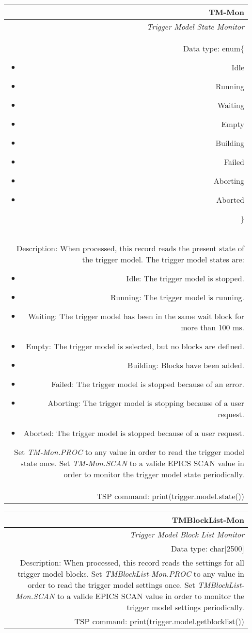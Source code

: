 \documentclass[openany]{article}
\begin{document}
		\begin{tabular}{N}
			\hline
			\bfseries TM-Mon\label{pv:tm-mon} \\ \hline
			\emph{Trigger Model State Monitor} \\
			Data type: enum\{\begin{itemize}[noitemsep]
				\small
				\item[] Idle
				\item[] Running
				\item[] Waiting
				\item[] Empty
				\item[] Building
				\item[] Failed
				\item[] Aborting
				\item[] Aborted
			\end{itemize}\} \\
			Description: When processed, this record reads the present state of the trigger model. The trigger model states are: \begin{itemize} \item Idle: The trigger model is stopped. \item Running: The trigger model is running. \item Waiting: The trigger model has been in the same wait block for more than 100 ms. \item Empty: The trigger model is selected, but no blocks are defined. \item Building: Blocks have been added. \item Failed: The trigger model is stopped because of an error. \item Aborting: The trigger model is stopping because of a user request. \item Aborted: The trigger model is stopped because of a user request. \end{itemize} Set \emph{TM-Mon.PROC} to any value in order to read the trigger model state once. Set \emph{TM-Mon.SCAN} to a valide EPICS SCAN value in order to monitor the trigger model state periodically. \\
			TSP command: print(trigger.model.state())
		\end{tabular}

		\begin{tabular}{N}
			\hline
			\bfseries TMBlockList-Mon\label{pv:tmblocklist-mon} \\ \hline
			\emph{Trigger Model Block List Monitor} \\
			Data type: char[2500] \\
			Description: When processed, this record reads the settings for all trigger model blocks. Set \emph{TMBlockList-Mon.PROC} to any value in order to read the trigger model settings once. Set \emph{TMBlockList-Mon.SCAN} to a valide EPICS SCAN value in order to monitor the trigger model settings periodically. \\
			TSP command: print(trigger.model.getblocklist())
		\end{tabular}
\end{document}
